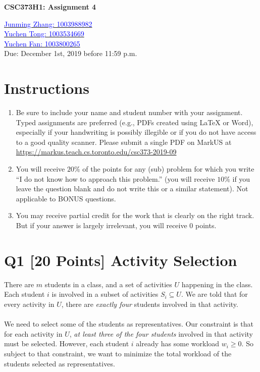 \documentclass[10pt]{article}
\begin{document}
\begin{center}
\Large \textbf{CSC373H1: Assignment 4}

\vspace{1mm}
\large {\href{mailto:junmingpeter.zhang@mail.utoronto.ca?Subject=CSC373H1: Assignment 4}{\textcolor{blue}{Junming Zhang: 1003988982}}\\
        \href{mailto:yuchen.tong@mail.utoronto.ca?Subject=CSC373H1: Assignment 4}{\textcolor{blue}{Yuchen Tong: 1003534669}}\\
        \href{mailto:yuchen.fan@mail.utoronto.ca?Subject=CSC373H1: Assignment 4}{\textcolor{blue}{Yuchen Fan: 1003800265}}}\\

\vspace{1mm}
\large {Due: December 1st, 2019 before 11:59 p.m.}
\end{center}
\section*{Instructions}
\begin{enumerate}
    \item Be sure to include your name and student number with your assignment. Typed assignments are preferred (e.g., PDFs created using LaTeX or Word), especially if your handwriting is possibly illegible or if you do not have access to a good quality scanner. Please submit a single PDF on MarkUS at \url{https://markus.teach.cs.toronto.edu/csc373-2019-09}
    \item You will receive $20\%$ of the points for any (sub) problem for which you write “I do not know how to approach this problem.” (you will receive $10\%$ if you leave the question blank and do not write this or a similar statement). Not applicable to BONUS questions.
    \item You may receive partial credit for the work that is clearly on the right track. But if your answer is largely irrelevant, you will receive 0 points.
\end{enumerate}

\section*{Q1 [20 Points] Activity Selection}
There are $m$ students in a class, and a set of activities $U$ happening in the class. Each student $i$ is involved in a subset of activities $S_i \subseteq U$. We are told that for every activity in $U$, there are \textit{exactly four} students involved in that activity.\\
\\
We need to select some of the students as representatives. Our constraint is that for each activity in $U$, \textit{at least three of the four students} involved in that activity must be selected. However, each student $i$ already has some workload $w_i \geq 0$. So subject to that constraint, we want to minimize the total workload of the students selected as representatives.
\end{document}
